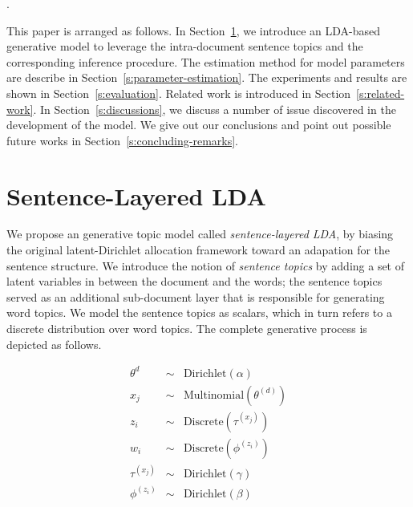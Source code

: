 .


This paper is arranged as follows.  In Section~\ref{s:sentence-layered-lda}, we
introduce an LDA-based generative model to leverage the intra-document sentence
topics and the corresponding inference procedure.  The estimation method for
model parameters are describe in Section~\ref{s:parameter-estimation}.  The
experiments and results are shown in Section~\ref{s:evaluation}.  Related work
is introduced in Section~\ref{s:related-work}.  In Section~\ref{s:discussions},
we discuss a number of issue discovered in the development of the model.  We
give out our conclusions and point out possible future works in
Section~\ref{s:concluding-remarks}.  

\section{Sentence-Layered LDA} \label{s:sentence-layered-lda} We propose an
generative topic model called {\it sentence-layered LDA}, by biasing the
original latent-Dirichlet allocation framework toward an adapation {for} the
sentence structure.  We introduce the notion of {\it sentence topics} by adding
a set of latent variables in between the document and the words; the sentence
topics served as an additional sub-document layer that is responsible for
generating word topics.  We model the sentence topics as scalars, which in turn
refers to a discrete distribution over word topics.  The complete generative
process is depicted as follows.

\begin{eqnarray*}
  \theta^{d} &\sim& \mathrm{Dirichlet}(\alpha) \\
  x_j &\sim& \mathrm{Multinomial}(\theta^{(d)}) \\
  z_i &\sim& \mathrm{Discrete}(\tau^{(x_j)}) \\
  w_i &\sim& \mathrm{Discrete}(\phi^{(z_i)}) \\
  \tau^{(x_j)} &\sim& \mathrm{Dirichlet}(\gamma) \\
  \phi^{(z_i)} &\sim& \mathrm{Dirichlet}(\beta) 
\end{eqnarray*}

